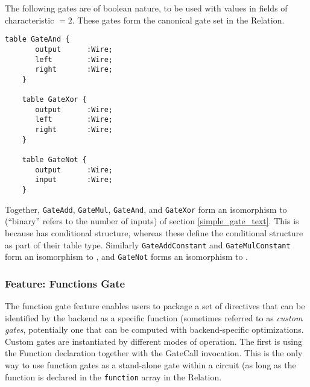 The following gates are of boolean nature, to be used with values in fields of \\
characteristic $= 2$. These gates form the canonical  gate set in the \textsf{Relation}.

\begin{lstlisting}[style=fbslisting]
    table GateAnd {
       output      :Wire;
       left        :Wire;
       right       :Wire;
    }
    
    table GateXor {
       output      :Wire;
       left        :Wire;
       right       :Wire;
    }
    
    table GateNot {
       output      :Wire;
       input       :Wire;
    }
\end{lstlisting}

Together, \texttt{GateAdd}, \texttt{GateMul}, \texttt{GateAnd}, and \texttt{GateXor} form an isomorphism to  (``binary'' refers to the number of inputs) of section \ref{simple_gate_text}. This is because  has conditional structure, whereas these define the conditional structure as part of their table type.
Similarly \texttt{GateAddConstant} and \texttt{GateMulConstant} form an isomorphism to , and \texttt{GateNot} forms an isomorphism to .

\subsubsection{Feature: Functions Gate}\label{sec:function-gates}

The function gate feature enables users to package a set of directives that can be identified by the backend as a specific function (sometimes referred to as \emph{custom gates}, potentially one that can be computed with backend-specific optimizations. Custom gates are instantiated by different modes of operation. The first is using the \textsf{Function} declaration together with the \textsf{GateCall} invocation.  This is the only way to use function gates as a stand-alone gate within a circuit (as long as the function is declared in the \texttt{function} array in the \textsf{Relation}.

